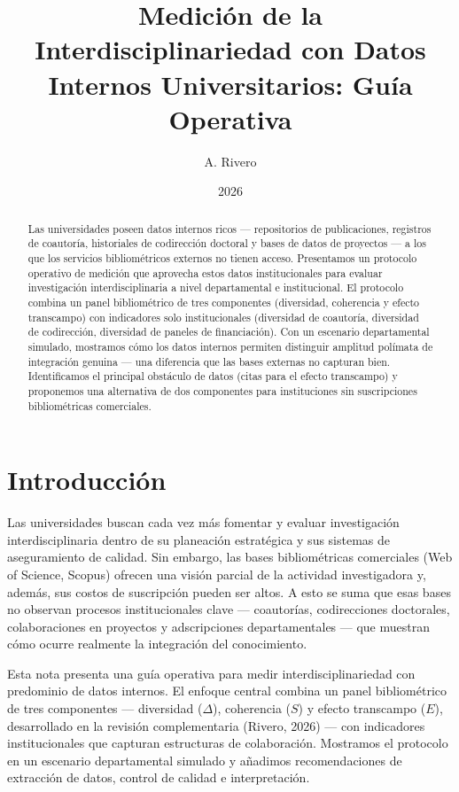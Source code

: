 \documentclass[
]{article}
\title{Medición de la Interdisciplinariedad con Datos Internos
Universitarios: Guía Operativa}
\author{A. Rivero}
\date{2026}
\begin{document}
\maketitle
\begin{abstract}
Las universidades poseen datos internos ricos --- repositorios de
publicaciones, registros de coautoría, historiales de codirección
doctoral y bases de datos de proyectos --- a los que los servicios
bibliométricos externos no tienen acceso. Presentamos un protocolo
operativo de medición que aprovecha estos datos institucionales para
evaluar investigación interdisciplinaria a nivel departamental e
institucional. El protocolo combina un panel bibliométrico de tres
componentes (diversidad, coherencia y efecto transcampo) con indicadores
solo institucionales (diversidad de coautoría, diversidad de
codirección, diversidad de paneles de financiación). Con un escenario
departamental simulado, mostramos cómo los datos internos permiten
distinguir amplitud polímata de integración genuina --- una diferencia
que las bases externas no capturan bien. Identificamos el principal
obstáculo de datos (citas para el efecto transcampo) y proponemos una
alternativa de dos componentes para instituciones sin suscripciones
bibliométricas comerciales.
\end{abstract}

\hypertarget{introducciuxf3n}{%
\section{Introducción}\label{introducciuxf3n}}

Las universidades buscan cada vez más fomentar y evaluar investigación
interdisciplinaria dentro de su planeación estratégica y sus sistemas de
aseguramiento de calidad. Sin embargo, las bases bibliométricas
comerciales (Web of Science, Scopus) ofrecen una visión parcial de la
actividad investigadora y, además, sus costos de suscripción pueden ser
altos. A esto se suma que esas bases no observan procesos
institucionales clave --- coautorías, codirecciones doctorales,
colaboraciones en proyectos y adscripciones departamentales --- que
muestran cómo ocurre realmente la integración del conocimiento.

Esta nota presenta una guía operativa para medir interdisciplinariedad
con predominio de datos internos. El enfoque central combina un panel
bibliométrico de tres componentes --- diversidad (\(\Delta\)),
coherencia (\(S\)) y efecto transcampo (\(E\)), desarrollado en la
revisión complementaria (Rivero, 2026) --- con indicadores
institucionales que capturan estructuras de colaboración. Mostramos el
protocolo en un escenario departamental simulado y añadimos
recomendaciones de extracción de datos, control de calidad e
interpretación.
\end{document}
